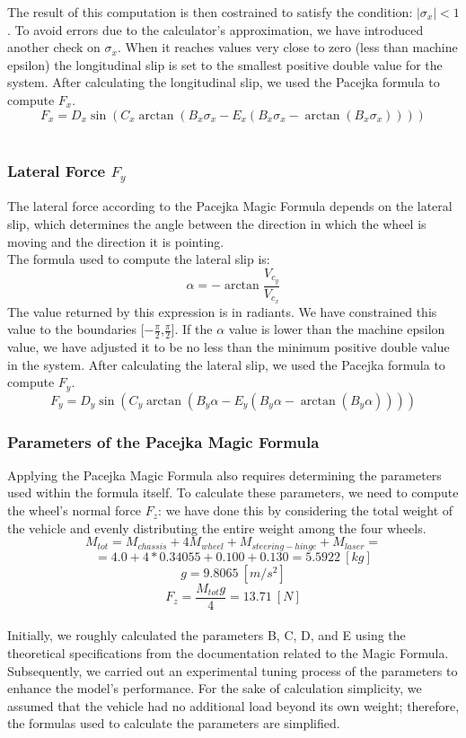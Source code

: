 The result of this computation is then costrained to satisfy the condition: $|\sigma_x| < 1$. To avoid errors due to the calculator's approximation, we have introduced another check on $\sigma_x$. When it reaches values very close to zero (less than machine epsilon) the longitudinal slip is set to the smallest positive double value for the system.
After calculating the longitudinal slip, we used the Pacejka formula to compute $F_x$.
\\
\[F_x = D_x\sin(C_x\arctan(B_x\sigma_x - E_x(B_x\sigma_x - \arctan(B_x\sigma_x))))\]\\

\subsubsection{Lateral Force $F_y$}
The lateral force according to the Pacejka Magic Formula depends on the lateral slip, which determines the angle between the direction in which the wheel is moving and the direction it is pointing.
\\
The formula used to compute the lateral slip is:
\[
\alpha = - \arctan{\frac{V_{c_y}}{V_{c_x}}}
\] 
The value returned by this expression is in radiants. We have constrained this value to the boundaries $[-\frac{\pi}{2}$,$\frac{\pi}{2}]$. If the $\alpha$ value is lower than the machine epsilon value, we have adjusted it to be no less than the minimum positive double value in the system.
After calculating the lateral slip, we used the Pacejka formula to compute $F_y$.
\\
\[F_y = D_y\sin(C_y\arctan(B_y\alpha - E_y(B_y\alpha - \arctan(B_y\alpha))))\]

\subsubsection{Parameters of the Pacejka Magic Formula}
Applying the Pacejka Magic Formula also requires determining the parameters used within the formula itself. 
To calculate these parameters, we need to compute the wheel's normal force $F_z$: we have done this by considering the total weight of the vehicle and evenly distributing the entire weight among the four wheels.
\\
\[M_{tot} = M_{chassis} + 4M_{wheel} + M_{steering-hinge} + M_{laser} = \]
 \[ = 4.0 + 4*0.34055 + 0.100 + 0.130 = 5.5922 \ [kg]\]
\[g = 9.8065 \ [m/s^2]\]
\[F_z = \frac{M_{tot}g}{4} = 13.71 \ [N]\]\\

Initially, we roughly calculated the parameters B, C, D, and E using the theoretical specifications from the documentation related to the Magic Formula. Subsequently, we carried out an experimental tuning process of the parameters to enhance the model's performance.
For the sake of calculation simplicity, we assumed that the vehicle had no additional load beyond its own weight; therefore, the formulas used to calculate the parameters are simplified.

